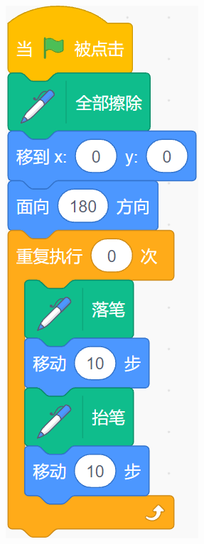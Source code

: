 \documentclass[10pt, a4paper]{article}
\begin{document}
\begin{enumerate}
\begin{figure}[htbp]
\begin{minipage}[t]{.11\textwidth}
                \includegraphics[width=\textwidth]{2.png}

\end{minipage}
\end{figure}
\end{enumerate}
\end{document}
